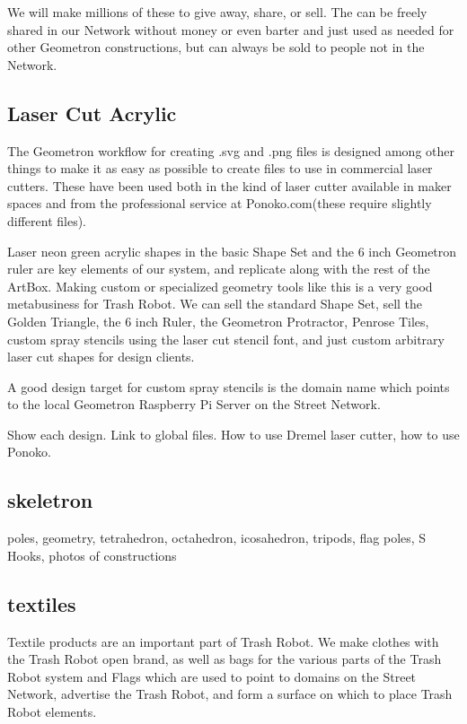 We will make millions of these to give away, share, or sell.  The can be freely shared in our Network without money or even barter and just used as needed for other Geometron constructions, but can always be sold to people not in the Network.

\subsection{Laser Cut Acrylic}

The Geometron workflow for creating .svg and .png files is designed among other things to make it as easy as possible to create files to use in commercial laser cutters.  These have been used both in the kind of laser cutter available in maker spaces and from the professional service at Ponoko.com(these require slightly different files).  

Laser neon green acrylic shapes in the basic Shape Set and the 6 inch Geometron ruler are key elements of our system, and replicate along with the rest of the ArtBox.  Making custom or specialized geometry tools like this is a very good metabusiness for Trash Robot.  We can sell the standard Shape Set, sell the Golden Triangle, the 6 inch Ruler, the Geometron Protractor, Penrose Tiles, custom spray stencils using the laser cut stencil font, and just custom arbitrary laser cut shapes for design clients.  

A good design target for custom spray stencils is the domain name which points to the local Geometron Raspberry Pi Server on the Street Network. 

Show each design. Link to global files.  How to use Dremel laser cutter, how to use Ponoko.  

\subsection{skeletron}

poles, geometry, tetrahedron, octahedron, icosahedron, tripods, flag poles, S Hooks, photos of constructions

\subsection{textiles}

Textile products are an important part of Trash Robot.  We make clothes with the Trash Robot open brand, as well as bags for the various parts of the Trash Robot system and Flags which are used to point to domains on the Street Network, advertise the Trash Robot, and form a surface on which to place Trash Robot elements.

